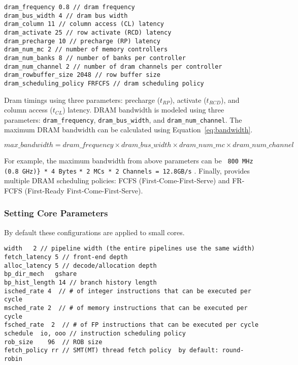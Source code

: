 \begin{Verbatim}
dram_frequency 0.8 // dram frequency
dram_bus_width 4 // dram bus width
dram_column 11 // column access (CL) latency
dram_activate 25 // row activate (RCD) latency
dram_precharge 10 // precharge (RP) latency
dram_num_mc 2 // number of memory controllers
dram_num_banks 8 // number of banks per controller
dram_num_channel 2 // number of dram channels per controller
dram_rowbuffer_size 2048 // row buffer size
dram_scheduling_policy FRFCFS // dram scheduling policy
\end{Verbatim}


Dram timings using three parameters: precharge ($t_{RP}$), activate
($t_{RCD}$), and column access ($t_{CL}$) latency. DRAM bandwidth is
modeled using three
parameters: \Verb+dram_frequency+, \Verb+dram_bus_width+,
and \Verb+dram_num_channel+. The maximum DRAM bandwidth can be
calculated using Equation~\ref{eq:bandwidth}.

\begin{equation}
\label{eq:bandwidth}
max\_bandwidth = dram\_frequency \times dram\_bus\_width \times dram\_num\_mc \times dram\_num\_channel 
\end{equation}

For example, the maximum bandwidth from above parameters can be
\Verb+ 800 MHz (0.8 GHz)} * 4 Bytes+
  \Verb+* 2 MCs * 2 Channels = 12.8GB/s+ . Finally, \SIM provides
  multiple DRAM scheduling policies: FCFS (First-Come-First-Serve) and
  FR-FCFS (First-Ready First-Come-First-Serve).


\subsubsection{Setting \cpu Core Parameters}

By default these configurations are applied to small cores. 

\begin{Verbatim}
width   2 // pipeline width (the entire pipelines use the same width) 
fetch_latency 5 // front-end depth 
alloc_latency 5 // decode/allocation depth  
bp_dir_mech   gshare 
bp_hist_length 14 // branch history length 
isched_rate 4  // # of integer instructions that can be executed per cycle 
msched_rate 2  // # of memory instructions that can be executed per cycle 
fsched_rate  2  // # of FP instructions that can be executed per cycle 
schedule  io, ooo // instruction scheduling policy 
rob_size    96  // ROB size
fetch_policy rr // SMT(MT) thread fetch policy  by default: round-robin 
\end{Verbatim}


